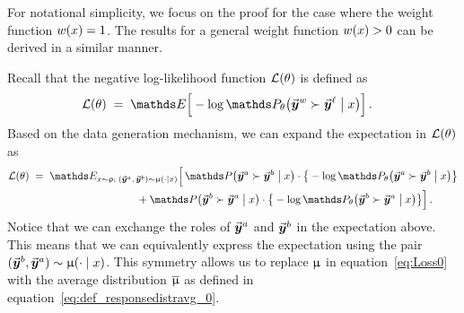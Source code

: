 	
	For notational simplicity, we focus on the proof for the case where the weight function $w(x) = 1$. The results for a general weight function $w(x) > 0$ can be derived in a similar manner.
	
	Recall that the negative log-likelihood function $\mathcal{L}(\theta)$ is defined as
	\begin{align*}
		\Loss(\paratheta) & \; = \;
		\Exp \Big[ - \log \Probtheta\big( \responsewin \succ \responselose \bigm| \prompt \big) \Big] \, .
	\end{align*}
	Based on the data generation mechanism, we can expand the expectation in $\mathcal{L}(\theta)$ as
	\begin{align}
		\Loss(\paratheta)
		& \; = \; \Exp_{\prompt \sim \promptdistr; \; (\responseone, \, \responsetwo) \sim \responsedistr(\cdot \mid \prompt)}
		\Big[ \, \Prob\big( \responseone \succ \responsetwo \bigm| \prompt \big) \cdot \big\{ - \log \Probtheta \big( \responseone \succ \responsetwo \bigm| \prompt \big) \big\}  \notag  \\
		\label{eq:Loss0}
		& \qquad \qquad \qquad \qquad \qquad + \Prob\big( \responsetwo \succ \responseone \bigm| \prompt \big) \cdot \big\{ - \log \Probtheta\big( \responsetwo \succ \responseone \bigm| \prompt \big) \big\} \Big] \, .
	\end{align}
	Notice that we can exchange the roles of $\vec{\boldsymbol{y}}\!\,^a$ and $\vec{\boldsymbol{y}}\!\,^b$ in the expectation above. This means that we can equivalently express the expectation using the pair $(\vec{\boldsymbol{y}}\!\,^b, \vec{\boldsymbol{y}}\!\,^a) \sim \upmu(\cdot \mid x)$.
	This symmetry allows us to replace $\upmu$ in equation~\eqref{eq:Loss0} with the average distribution $\overline{\upmu}$ as defined in equation~\eqref{eq:def_responsedistravg_0}. \\
	
